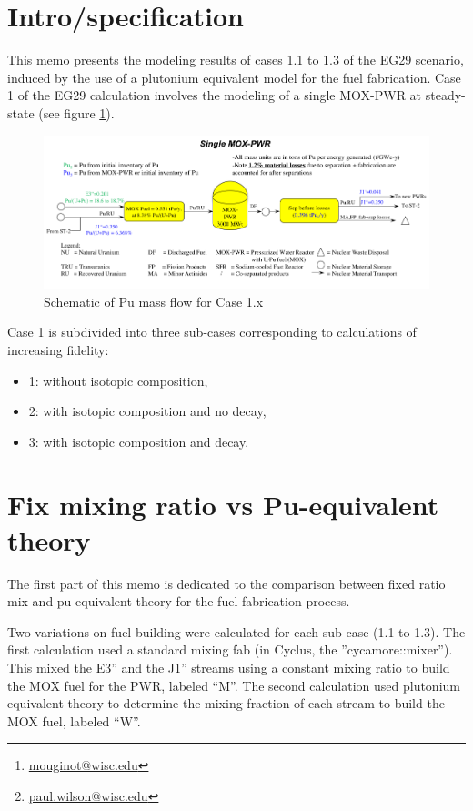 \documentclass[10pt]{article}
\title{}
\author[1]{B. Mouginot  \thanks{\href{mailto:mouginot@wisc.edu}{mouginot@wisc.edu}}}
\author[1]{P.P.H. Wilson\thanks{\href{mailto:paul.wilson@wisc.edu}{paul.wilson@wisc.edu}}}
\author[1]{R. Carlsen}
\author[1]{A. Opotowsky}
\affil[1]{University of Wisconsin--Madison, Department of Engineering Physics, CNERG group}
\date{\today}
\begin{document}
\maketitle

\section{Intro/specification}

This memo presents the modeling results of cases 1.1 to 1.3 of the EG29
scenario, induced by the use of a plutonium equivalent model for the fuel
fabrication. Case 1 of the EG29 calculation involves the modeling of a single
MOX-PWR at steady-state (see figure \ref{fig:puflow}).

\begin{figure}[h!]
    \centering
    \includegraphics[width=1\textwidth]  {img/puflow}
    \caption{Schematic of Pu mass flow for Case 1.x}
    \label{fig:puflow}
\end{figure}

Case 1 is subdivided into three sub-cases corresponding to calculations of
increasing fidelity: 
\begin{itemize}
  \item	1: without isotopic composition, 
  \item 2: with isotopic composition and no decay,
  \item 3: with isotopic composition and decay.
\end{itemize}


\section{Fix mixing ratio vs Pu-equivalent theory}

The first part of this memo is dedicated to the comparison between fixed ratio
mix and pu-equivalent theory for the fuel fabrication process.

Two variations on fuel-building were calculated for each sub-case (1.1 to 1.3).
The first calculation used a standard mixing fab (in Cyclus, the
''cycamore::mixer''). This mixed the E3” and the J1” streams using a constant mixing
ratio to build the MOX fuel for the PWR, labeled “M”. The second calculation
used plutonium equivalent theory to determine the mixing fraction of each stream
to build the MOX fuel, labeled “W”.
\end{document}
